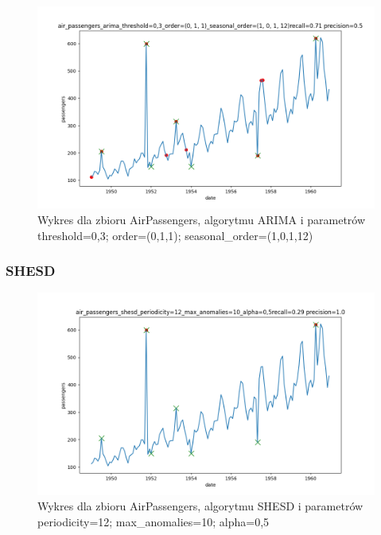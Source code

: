 \documentclass{classrep}
\begin{document}
{{{                \begin{figure}[!htbp]
                    \centering
                    \includegraphics[width=\textwidth]{img/air_passengers_arima_threshold=0,3_order=(0,1,1)_seasonal_order=(1,0,1,12)-203749.png}
                    \caption
                    {Wykres dla zbioru AirPassengers, algorytmu ARIMA i parametrów threshold=0,3; order=(0,1,1); seasonal\_order=(1,0,1,12)}
                    \label{fig:arima_air}
                \end{figure}
                \FloatBarrier
            }

            \subsubsection{SHESD} {

                \begin{figure}[!htbp]
                    \centering
                    \includegraphics[width=\textwidth]{img/air_passengers_shesd_periodicity=12_max_anomalies=10_alpha=0,5-203733.png}
                    \caption
                    {Wykres dla zbioru AirPassengers, algorytmu SHESD i parametrów periodicity=12; max\_anomalies=10; alpha=0,5}
                    \label{fig:shesd_air}
                \end{figure}
                \FloatBarrier
            }
        }

}
\end{document}
